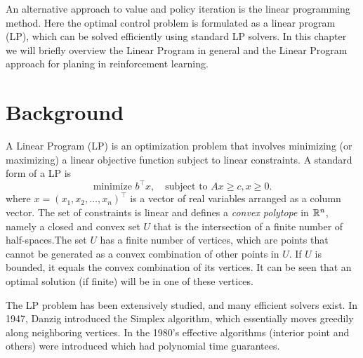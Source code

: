 



An alternative approach to value and policy iteration is the linear programming method. Here the optimal control problem is formulated as a linear program (LP), which can be solved efficiently using standard LP solvers.  
%
In this chapter we will briefly overview the Linear Program in general and the Linear Program approach for planing in reinforcement learning.


\section{Background}

A Linear Program (LP) is an optimization problem that involves
minimizing (or maximizing) a linear objective function subject to
linear constraints. A standard form of a LP is
\begin{equation}\label{eq:LP}
 \textrm{minimize } {b^\top}x,   \quad \textrm{subject to } Ax \ge c,  x \ge 0.
\end{equation}
where $x = {({x_1},{x_2}, \ldots ,{x_n})^\top}$ is a vector of real
variables arranged as a column vector. The set of constraints is
linear and defines a \emph{convex polytope} in $\mathbb{R}^n$, namely a
closed and convex set $U$ that is the intersection of a finite
number of half-spaces.The set  $U$ has a finite number of vertices, which are points that cannot be generated as a convex combination of other points in $U$. If $U$ is bounded, it equals the convex combination of its vertices. It can be seen that an optimal solution (if finite) will be in one of these vertices.

The LP problem has been extensively studied, and many efficient solvers exist. In 1947, Danzig introduced the Simplex algorithm, which essentially moves greedily along neighboring vertices.  In the 1980's effective algorithms (interior point and others) were introduced which had polynomial time guarantees.

